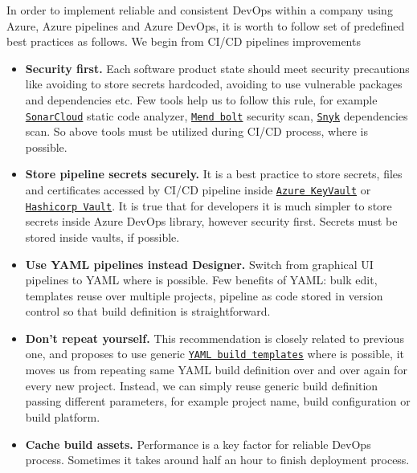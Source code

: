 In order to implement reliable and consistent DevOps within a company using Azure, Azure pipelines and Azure DevOps,
it is worth to follow set of predefined best practices as follows.
We begin from CI/CD pipelines improvements
\begin{itemize}
    \item \textbf{Security first.} Each software product state should meet security precautions like avoiding to
    store secrets hardcoded, avoiding to use vulnerable packages and dependencies etc.
    Few tools help us to follow this rule, for example
    \href{https://www.sonarsource.com/products/sonarcloud/}{\texttt{SonarCloud}} static code analyzer,
    \href{https://www.mend.io/free-developer-tools/bolt/}{\texttt{Mend bolt}} security scan,
    \href{https://snyk.io/}{\texttt{Snyk}} dependencies scan.
    So above tools must be utilized during CI/CD process, where is possible.
    \item \textbf{Store pipeline secrets securely.}
    It is a best practice to store secrets, files and certificates accessed by CI/CD pipeline inside
    \href{https://azure.microsoft.com/en-us/products/key-vault/}{\texttt{Azure KeyVault}} or
    \href{https://www.vaultproject.io/}{\texttt{Hashicorp Vault}}.
    It is true that for developers it is much simpler to store secrets inside Azure DevOps library, however security first.
    Secrets must be stored inside vaults, if possible.
    \item \textbf{Use YAML pipelines instead Designer.}
    Switch from graphical UI pipelines to YAML where is possible.
    Few benefits of YAML: bulk edit, templates reuse over multiple projects, pipeline as code stored in version control
    so that build definition is straightforward.
    \item \textbf{Don't repeat yourself.} This recommendation is closely related to previous one, and proposes to use
    generic
    \href{https://learn.microsoft.com/en-us/azure/devops/pipelines/process/templates?view=azure-devops}
    {\texttt{YAML build templates}}
    where is possible, it moves us from repeating same YAML build definition over and over
    again for every new project.
    Instead, we can simply reuse generic build definition passing different parameters, for example project name, build
    configuration or build platform.
    \item \textbf{Cache build assets.} Performance is a key factor for reliable DevOps process.
    Sometimes it takes around half an hour to finish deployment process.

\end{itemize}
